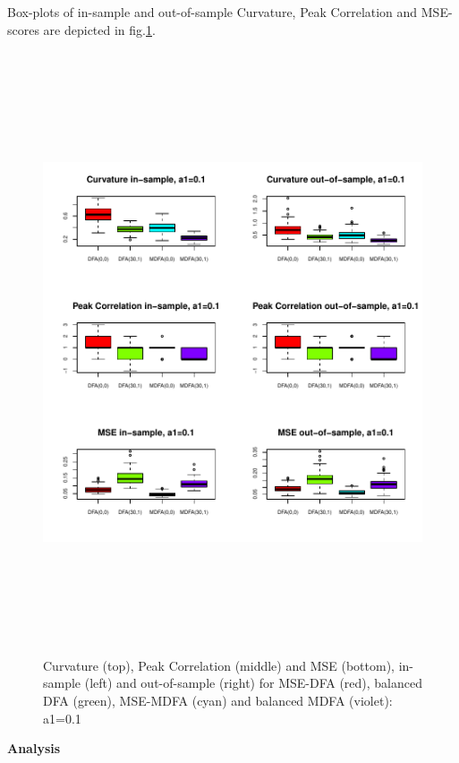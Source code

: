 \documentclass[a4paper]{book}
\begin{document}
Box-plots of in-sample and out-of-sample Curvature, Peak Correlation and MSE-scores are depicted in fig.\ref{z_curv_mdfacust_leadind_ST}.
\begin{figure}[H]\begin{center}\includegraphics[height=7in, width=5in]{z_curv_mdfacust_leadind_ST}\caption{Curvature (top), Peak Correlation (middle) and MSE (bottom), in-sample (left) and out-of-sample (right) for MSE-DFA (red), balanced DFA (green), MSE-MDFA (cyan) and balanced MDFA (violet): a1=0.1\label{z_curv_mdfacust_leadind_ST}}\end{center}\end{figure}\textbf{Analysis}
\end{document}
